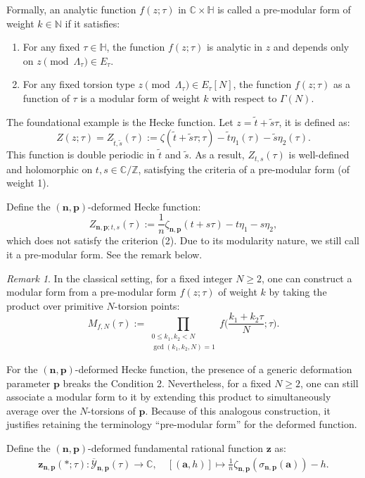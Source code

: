 \documentclass[11pt]{amsart}
\theoremstyle{remark}
\newtheorem{remark}[theorem]{Remark}
\numberwithin{equation}{section}
\begin{document}
Formally, an analytic function $f(z;\tau)$ in $\mathbb{C} \times \mathbb{H}$ is called a pre-modular form of weight $k\in \mathbb{N}$ if it satisfies:
\begin{enumerate}
    \item For any fixed $\tau \in \mathbb{H}$, the function $f(z; \tau)$ is analytic in $z$ and depends only on $z \pmod{\Lambda_\tau} \in E_\tau$.
    \item For any fixed torsion type $z \pmod{\Lambda_\tau} \in E_\tau[N]$, the function $f(z; \tau)$ as a function of $\tau$ is a modular form of weight $k$ with respect to $\Gamma(N)$.
\end{enumerate}

The foundational example is the Hecke function. Let $z = \tilde{t}+\tilde{s}\tau$, it is defined as:
\[
Z(z;\tau) = Z_{\tilde{t},\tilde{s}}(\tau) := \zeta(\tilde{t}+\tilde{s}\tau; \tau) - \tilde{t} \eta_1(\tau) - \tilde{s} \eta_2(\tau).
\]
This function is double periodic in $\tilde{t}$ and $\tilde{s}$.
As a result, $Z_{t,s}(\tau)$ is well-defined and holomorphic on $t, s \in \mathbb{C}/\mathbb{Z}$, satisfying the criteria of a pre-modular form (of weight 1).

Define the $(\mathbf{n},\mathbf{p})$-deformed Hecke function:
\[
    Z_{\mathbf{n},\mathbf{p};t,s}(\tau):= \frac{1}{n} \zeta_{\mathbf{n},\mathbf{p}}(t+s\tau) - t \eta_1 -s\eta_2,
\]
which does not satisfy the criterion (2). Due to its modularity nature, we still call it a pre-modular form. See the remark below.
\begin{remark} \label{r:modular_form}
In the classical setting, for a fixed integer $N \geq 2$, one can construct a modular form from a pre-modular form $f(z;\tau)$ of weight $k$ by taking the product over primitive $N$-torsion points:
\[
    M_{f,N}(\tau) := \prod_{ \substack{0\leq k_1,k_2<N \\ \gcd(k_1,k_2,N)=1} } f \Big(\frac{k_1+k_2\tau}{N};\tau \Big).
\]

For the $(\mathbf{n},\mathbf{p})$-deformed Hecke function, the presence of a generic deformation parameter $\mathbf{p}$ breaks the Condition 2. Nevertheless, for a fixed $N \geq 2$, one can still associate a modular form to it by extending this product to simultaneously average over the $N$-torsions of $\mathbf{p}$. Because of this analogous construction, it justifies retaining the terminology ``pre-modular form'' for the deformed function.
\end{remark}

Define the $(\mathbf{n}, \mathbf{p})$-deformed fundamental rational function $\mathbf{z}$ as:
\[
\begin{split}
    \mathbf{z}_{\mathbf{n},\mathbf{p}}(*;\tau): \overline{\mathcal{Y}}_{\mathbf{n},\mathbf{p}}(\tau) \rightarrow \mathbb{C}, \quad
    [(\mathbf{a},h)]  \mapsto \frac{1}{n} \zeta_{\mathbf{n},\mathbf{p}}( \sigma_{\mathbf{n},\mathbf{p}}(\mathbf{a})) - h .
\end{split}
\]
\end{document}
